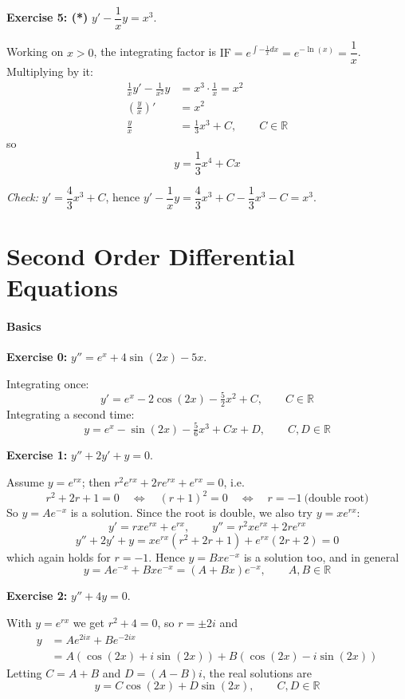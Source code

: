 \documentclass[]{article}
\newcommand{\R}{\mathbb{R}}
\begin{document}
	\textbf{Exercise 5: (*)} $y' - \dfrac{1}{x} y = x^3$.

	Working on $x > 0$, the integrating factor is $\mathrm{IF} = e^{\int -\frac{1}{x} dx} = e^{-\ln(x)} = \dfrac{1}{x}$. Multiplying by it:
	\begin{align*}
		\frac{1}{x} y' - \frac{1}{x^2} y &= x^3 \cdot \frac{1}{x} = x^2 \\
		\left(\frac{y}{x}\right)' &= x^2 \\
		\frac{y}{x} &= \frac{1}{3} x^3 + C, \qquad C \in \R
	\end{align*}
	so
	$$y = \frac{1}{3} x^4 + C x$$

	\textit{Check:} $y' = \dfrac{4}{3}x^3 + C$, hence $y' - \dfrac{1}{x} y = \dfrac{4}{3}x^3 + C - \dfrac{1}{3}x^3 - C = x^3$. \checkmark



	\section{Second Order Differential Equations}
	\paragraph{Basics}\mbox{}

	\textbf{Exercise 0:} $y'' = e^x + 4\sin(2x) - 5x$.

	Integrating once:
	$$y' = e^x - 2\cos(2x) - \tfrac{5}{2} x^2 + C, \qquad C \in \R$$
	Integrating a second time:
	$$y = e^x - \sin(2x) - \tfrac{5}{6} x^3 + Cx + D, \qquad C, D \in \R$$

	\textbf{Exercise 1:} $y'' + 2y' + y = 0$.

	Assume $y = e^{rx}$; then $r^2 e^{rx} + 2r e^{rx} + e^{rx} = 0$, i.e.
	$$r^2 + 2r + 1 = 0 \quad \Longleftrightarrow \quad (r+1)^2 = 0 \quad \Longleftrightarrow \quad r = -1 \ \text{(double root)}$$
	So $y = A e^{-x}$ is a solution. Since the root is double, we also try $y = x e^{rx}$:
	$$y' = r x e^{rx} + e^{rx}, \qquad y'' = r^2 x e^{rx} + 2r e^{rx}$$
	$$y'' + 2y' + y = x e^{rx}\left(r^2 + 2r + 1\right) + e^{rx}\left(2r + 2\right) = 0$$
	which again holds for $r = -1$. Hence $y = B x e^{-x}$ is a solution too, and in general
	$$y = A e^{-x} + B x e^{-x} = (A + Bx) e^{-x}, \qquad A, B \in \R$$

	\textbf{Exercise 2:} $y'' + 4y = 0$.

	With $y = e^{rx}$ we get $r^2 + 4 = 0$, so $r = \pm 2i$ and
	\begin{align*}
		y &= A e^{2ix} + B e^{-2ix} \\
		  &= A\left(\cos(2x) + i\sin(2x)\right) + B\left(\cos(2x) - i\sin(2x)\right)
	\end{align*}
	Letting $C = A + B$ and $D = (A - B) i$, the real solutions are
	$$y = C \cos(2x) + D \sin(2x), \qquad C, D \in \R$$
\end{document}
